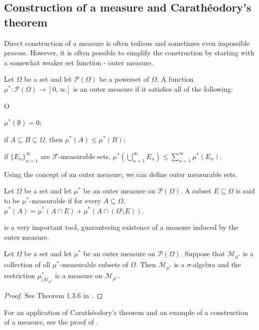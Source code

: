 \subsection{Construction of a measure and Carathéodory's theorem}
Direct construction of a measure is often tedious and sometimes even impossible process. However, it is often possible to simplify the construction by starting with a somewhat weaker set function - outer measure.
\begin{definition}
Let $\Omega$ be a set and let $\mathcal{P}(\Omega)$ be a powerset of $\Omega$. A function $\mu^{\ast} : \mathcal{P}(\Omega) \to [0, \infty]$ is an outer measure if it satisfies all of the following:
\begin{axioms}{O}
  \item \label{defn:measure:salg:OM1} $\mu^{\ast}(\emptyset) = 0$;
  \item \label{defn:measure:salg:OM2}  if $A \subseteq B \subseteq \Omega$, then $\mu^{\ast} (A) \leq \mu^{\ast}(B)$;
  \item \label{defn:measure:salg:OM3}  if $\{ E_n \}_{n=1}^\infty$ are  $\mathcal{F}$-measurable sets, $\mu^{\ast}(\bigcup_{n=1}^\infty E_n) \leq \sum_{n=1}^\infty \mu^{\ast}(E_n)$.
\end{axioms}
\end{definition}
Using the concept of an outer measure, we can define outer measurable sets.
\begin{definition}
Let $\Omega$ be a set and let $\mu^{\ast}$ be an outer measure on $\mathcal{P}(\Omega)$. A subset $E \subseteq \Omega$ is said to be $\mu^{\ast}$-measurable if for every $A \subseteq \Omega$, $\mu^{\ast}(A) = \mu^{\ast}(A \cap E) + \mu^{\ast}(A \cap (\Omega \setminus E))$.
\end{definition}
 is a very important tool, guaranteeing existence of a measure induced by the outer measure.
\begin{theorem}
\label{thm:measure:caratheodory}
Let $\Omega$ be a set and let $\mu^{\ast}$ be an outer measure on $\mathcal{P}(\Omega)$. Suppose that $\mathcal{M}_{\mu^{\ast}}$ is a collection of all $\mu^{\ast}$-measurable subsets of $\Omega$. Then $\mathcal{M}_{\mu^{\ast}}$ is a $\sigma$-algebra and the restriction $\mu^{\ast}_{| \mathcal{M}_{\mu^{\ast}}}$ is a measure on $\mathcal{M}_{\mu^{\ast}}$.
\end{theorem}
\begin{proof}
See Theorem 1.3.6 in \cite{cohn_2013_measure}.
\end{proof}
For an application of Carathéodory's theorem and an example of a construction of
a measure, see the proof of .

